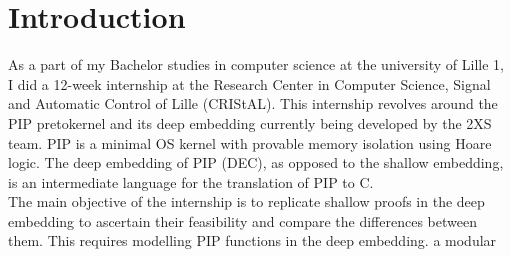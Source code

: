 \chapter{Introduction}

As a part of my Bachelor studies in computer science at the university of Lille 1, I did a 12-week internship at the Research Center in Computer Science, Signal and Automatic Control of Lille (CRIStAL). This internship revolves around the PIP pretokernel and its deep embedding currently being developed by the 2XS team. PIP is a minimal OS kernel with provable memory isolation using Hoare logic. The deep embedding of PIP (DEC), as opposed to the shallow embedding, is an intermediate language for the translation of PIP to C.  \\

The main objective of the internship is to replicate shallow proofs in the deep embedding to ascertain their feasibility and compare the differences between them. This requires modelling PIP functions in the deep embedding.  a modular



